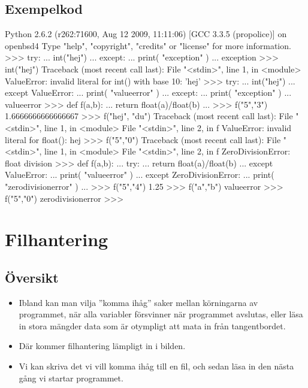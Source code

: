 \documentclass{beamer}
\begin{document}
\subsection{Exempelkod}

\begin{frame}{\insertsubsectionhead}
  \begin{terminal}
Python 2.6.2 (r262:71600, Aug 12 2009, 11:11:06)
[GCC 3.3.5 (propolice)] on openbsd4
Type "help", "copyright", "credits" or "license" for more information.
>>> try:
...     int("hej")
... except:
...     print( "exception" )
...
exception
>>> int("hej")
Traceback (most recent call last):
  File "<stdin>", line 1, in <module>
ValueError: invalid literal for int() with base 10: 'hej'
>>> try:
...     int("hej")
... except ValueError:
...     print( "valueerror" )
... except:
...     print( "exception" )
...
valueerror
>>> def f(a,b):
...     return float(a)/float(b)
...
>>> f("5","3")
1.6666666666666667
>>> f("hej", "du")
Traceback (most recent call last):
  File "<stdin>", line 1, in <module>
  File "<stdin>", line 2, in f
ValueError: invalid literal for float(): hej
>>> f("5","0")
Traceback (most recent call last):
  File "<stdin>", line 1, in <module>
  File "<stdin>", line 2, in f
ZeroDivisionError: float division
>>> def f(a,b):
...     try:
...             return float(a)/float(b)
...     except ValueError:
...             print( "valueerror" )
...     except ZeroDivisionError:
...             print( "zerodivisionerror" )
...
>>> f("5","4")
1.25
>>> f("a","b")
valueerror
>>> f("5","0")
zerodivisionerror
>>>
  \end{terminal}
\end{frame}


\section{Filhantering}

\subsection{Översikt}

\begin{frame}{\insertsubsectionhead}
  \begin{itemize}
    \item Ibland kan man vilja ''komma ihåg'' saker mellan körningarna av 
      programmet, när alla variabler försvinner när programmet avslutas, eller 
      läsa in stora mängder data som är otympligt att mata in från 
      tangentbordet.

    \item Där kommer filhantering lämpligt in i bilden.

    \item Vi kan skriva det vi vill komma ihåg till en fil, och sedan läsa in 
      den nästa gång vi startar programmet.

  \end{itemize}
\end{frame}
\end{document}
